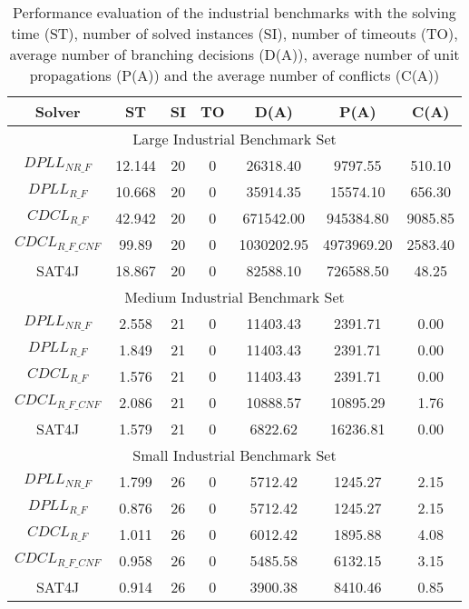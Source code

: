 \documentclass{easychair}
\begin{document}
\begin{table}
\centering
\caption{Performance evaluation of the industrial benchmarks with the solving time (ST), number of solved instances (SI), number of timeouts (TO), average number of branching decisions (D(A)), average number of unit propagations (P(A)) and the average number of conflicts (C(A))}
\label{tab:mBenchmarks}
\begin{tabular}{|c|c|c|c|c|c|c|}
\hline
Solver & ST & SI & TO & D(A) & P(A) & C(A)\\ 
\hline
\multicolumn{7}{|c|}{Large Industrial Benchmark Set}\\
\hline
$DPLL_{NR\_F}$ & 12.144 & 20 & 0 & 26318.40 & 9797.55 & 510.10 \\ 
\hline
$DPLL_{R\_F}$ & 10.668 & 20 & 0 & 35914.35 & 15574.10 & 656.30 \\ 
\hline
$CDCL_{R\_F}$ & 42.942 & 20 & 0 & 671542.00 & 945384.80 & 9085.85 \\ 
\hline
$CDCL_{R\_F\_CNF}$ & 99.89 & 20 & 0 & 1030202.95 & 4973969.20 & 2583.40 \\ 
\hline
SAT4J & 18.867 & 20 & 0 & 82588.10 & 726588.50 & 48.25 \\ 
\hline
\multicolumn{7}{|c|}{Medium Industrial Benchmark Set}\\
\hline
$DPLL_{NR\_F}$ & 2.558 & 21 & 0 & 11403.43 & 2391.71 & 0.00 \\ 
\hline
$DPLL_{R\_F}$ & 1.849 & 21 & 0 & 11403.43 & 2391.71 & 0.00 \\ 
\hline
$CDCL_{R\_F}$ & 1.576 & 21 & 0 & 11403.43 & 2391.71 & 0.00 \\ 
\hline
$CDCL_{R\_F\_CNF}$ & 2.086 & 21 & 0 & 10888.57 & 10895.29 & 1.76 \\ 
\hline
SAT4J & 1.579 & 21 & 0 & 6822.62 & 16236.81 & 0.00 \\ 
\hline
\multicolumn{7}{|c|}{Small Industrial Benchmark Set}\\
\hline
$DPLL_{NR\_F}$ & 1.799 & 26 & 0 & 5712.42 & 1245.27 & 2.15 \\ 
\hline
$DPLL_{R\_F}$ & 0.876 & 26 & 0 & 5712.42 & 1245.27 & 2.15 \\ 
\hline
$CDCL_{R\_F}$ & 1.011 & 26 & 0 & 6012.42 & 1895.88 & 4.08 \\ 
\hline
$CDCL_{R\_F\_CNF}$ & 0.958 & 26 & 0 & 5485.58 & 6132.15 & 3.15 \\ 
\hline
SAT4J & 0.914 & 26 & 0 & 3900.38 & 8410.46 & 0.85 \\ 
\hline

\end{tabular}
\end{table}
\end{document}
